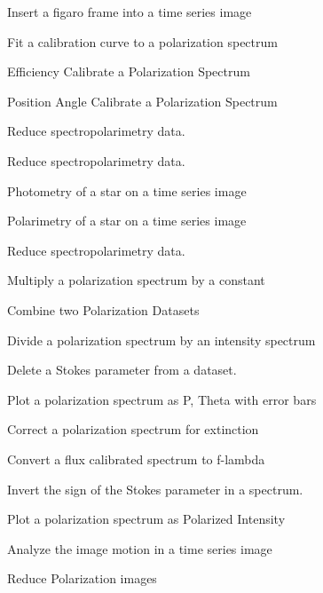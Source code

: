 \begin{mansectionroutines}
        Insert a figaro frame into a time series image

        Fit a calibration curve to a polarization spectrum

        Efficiency Calibrate a Polarization Spectrum

        Position Angle Calibrate a Polarization Spectrum

        Reduce {} spectropolarimetry data.

        Reduce {} spectropolarimetry data.

        Photometry of a star on a time series image

        Polarimetry of a star on a time series image

        Reduce {} spectropolarimetry data.

        Multiply a polarization spectrum by a constant

        Combine two Polarization Datasets

        Divide a polarization spectrum by an intensity spectrum

        Delete a Stokes parameter from a dataset.

        Plot a polarization spectrum as P, Theta with error bars

        Correct a polarization spectrum for extinction

        Convert a flux calibrated spectrum to f-lambda

        Invert the sign of the Stokes parameter in a spectrum.

        Plot a polarization spectrum as Polarized Intensity

        Analyze the image motion in a time series image

        Reduce {} Polarization images


\end{mansectionroutines}
